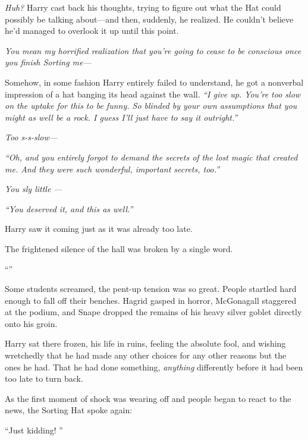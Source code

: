 \emph{Huh?} Harry cast back his thoughts, trying to figure out what the Hat could possibly be talking about—and then, suddenly, he realized. He couldn’t believe he’d managed to overlook it up until this point.

\emph{You mean my horrified realization that you’re going to cease to be conscious once you finish Sorting me—}

Somehow, in some fashion Harry entirely failed to understand, he got a nonverbal impression of a hat banging its head against the wall. \emph{“I give up. You’re too slow on the uptake for this to be funny. So blinded by your own assumptions that you might as well be a rock. I guess I’ll just have to say it outright.”}

\emph{Too s-s-slow—}

\emph{“Oh, and you entirely forgot to demand the secrets of the lost magic that created me. And they were such wonderful, important secrets, too.”}

\emph{You sly little —}

\emph{“You deserved it, and this as well.”}

Harry saw it coming just as it was already too late.

The frightened silence of the hall was broken by a single word.

“”

Some students screamed, the pent-up tension was so great. People startled hard enough to fall off their benches. Hagrid gasped in horror, McGonagall staggered at the podium, and Snape dropped the remains of his heavy silver goblet directly onto his groin.

Harry sat there frozen, his life in ruins, feeling the absolute fool, and wishing wretchedly that he had made any other choices for any other reasons but the ones he had. That he had done something, \emph{anything} differently before it had been too late to turn back.

As the first moment of shock was wearing off and people began to react to the news, the Sorting Hat spoke again:

“Just kidding! ”


